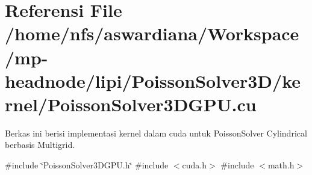 \hypertarget{PoissonSolver3DGPU_8cu}{}\section{Referensi File /home/nfs/aswardiana/\+Workspace/mp-\/headnode/lipi/\+Poisson\+Solver3\+D/kernel/\+Poisson\+Solver3\+D\+G\+PU.cu}
\label{PoissonSolver3DGPU_8cu}


Berkas ini berisi implementasi kernel dalam cuda untuk Poisson\+Solver Cylindrical berbasis Multigrid.  


{\ttfamily \#include \char`\"{}Poisson\+Solver3\+D\+G\+P\+U.\+h\char`\"{}}\newline
{\ttfamily \#include $<$cuda.\+h$>$}\newline
{\ttfamily \#include $<$math.\+h$>$}\newline
